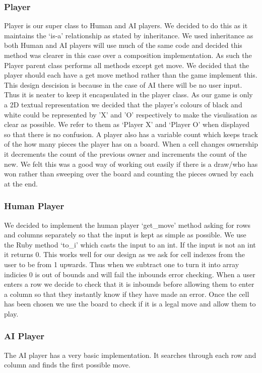 \documentclass[a4wide, 11pt]{article}
\begin{document}
  \subsubsection{Player}
  Player is our super class to Human and AI players. We decided to do this as it maintains the `is-a' relationship as stated by inheritance. We used inheritance as 
  both Human and AI players will use much of the same code and decided this method was clearer in this case over a composition implementation. \cite{compvsinher} As such the Player 
  parent class performs all methods except get move. We decided that the player should each have a get move method rather than the game implement this.
  This design descision is because in the case of AI there will be no user input. Thus it is neater to keep it encapsulated in the player class.
  As our game is only a 2D textual representation we decided that the player's colours of black and white could be represented by 'X' and 'O' respectively
  to make the visulisation as clear as possible. We refer to them as `Player X' and `Player O' when displayed so that there is no confusion. A player also has a 
  variable count which keeps track of the how many pieces the player has on a board. When a cell changes ownership it decrements the count of the previous owner
  and increments the count of the new. We felt this was a good way of working out easily if there is a draw/who has won rather than sweeping over the board and 
  counting the pieces owned by each at the end.

  \subsubsection{Human Player}
  We decided to implement the human player `get\_move' method asking for rows and columns separately so that the input is kept as simple as possible. We use the Ruby 
  method `to\_i' which casts the input to an int. If the input is not an int it returns 0. This works well for our design as we ask for cell indexes from the user
  to be from 1 upwards. Thus when we subtract one to turn it into array indicies 0 is out of bounds and will fail the inbounds error checking. When a user enters
  a row we decide to check that it is inbounds before allowing them to enter a column so that they instantly know if they have made an error. Once the cell has
  been chosen we use the board to check if it is a legal move and allow them to play.
  \subsubsection{AI Player}
  The AI player has a very basic implementation. It searches through each row and column and finds the first possible move. 
\end{document}
